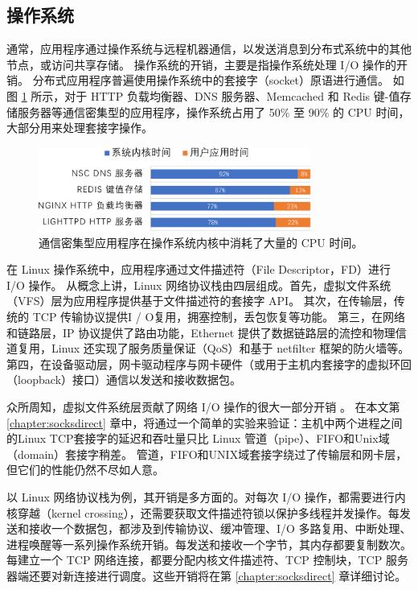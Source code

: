 \subsection{操作系统}

通常，应用程序通过操作系统与远程机器通信，以发送消息到分布式系统中的其他节点，或访问共享存储。
操作系统的开销，主要是指操作系统处理 I/O 操作的开销。
分布式应用程序普遍使用操作系统中的套接字（socket）原语进行通信。
如图 \ref{background:fig:kernel_time} 所示，对于 HTTP 负载均衡器、DNS 服务器、Memcached \cite{memcached} 和 Redis \cite{redis} 键-值存储服务器等通信密集型的应用程序，操作系统占用了 50\% 至 90\% 的 CPU 时间，大部分用来处理套接字操作。


\begin{figure}[htbp]
	\centering
	\includegraphics[width=0.8\textwidth]{figures/kernel_time.pdf}
	\caption{通信密集型应用程序在操作系统内核中消耗了大量的 CPU 时间。}
	\label{background:fig:kernel_time}
\end{figure}

在 Linux 操作系统中，应用程序通过文件描述符（File Descriptor，FD）进行 I/O 操作。
从概念上讲，Linux 网络协议栈由四层组成。首先，虚拟文件系统（VFS）层为应用程序提供基于文件描述符的套接字 API。
其次，在传输层，传统的 TCP 传输协议提供I / O复用，拥塞控制，丢包恢复等功能。
第三，在网络和链路层，IP 协议提供了路由功能，Ethernet 提供了数据链路层的流控和物理信道复用，Linux 还实现了服务质量保证（QoS）和基于 netfilter 框架的防火墙等。
第四，在设备驱动层，网卡驱动程序与网卡硬件（或用于主机内套接字的虚拟环回（loopback）接口）通信以发送和接收数据包。

众所周知，虚拟文件系统层贡献了网络 I/O 操作的很大一部分开销 \cite {clark1989analysis,boyd2010analysis}。
在本文第 \ref{chapter:socksdirect} 章中，将通过一个简单的实验来验证：主机中两个进程之间的Linux TCP套接字的延迟和吞吐量只比 Linux 管道（pipe）、FIFO和Unix域（domain）套接字稍差。
管道，FIFO和UNIX域套接字绕过了传输层和网卡层，但它们的性能仍然不尽如人意。

以 Linux 网络协议栈为例，其开销是多方面的。对每次 I/O 操作，都需要进行内核穿越（kernel crossing），还需要获取文件描述符锁以保护多线程并发操作。每发送和接收一个数据包，都涉及到传输协议、缓冲管理、I/O 多路复用、中断处理、进程唤醒等一系列操作系统开销。每发送和接收一个字节，其内存都要复制数次。每建立一个 TCP 网络连接，都要分配内核文件描述符、TCP 控制块，TCP 服务器端还要对新连接进行调度。这些开销将在第 \ref{chapter:socksdirect} 章详细讨论。

